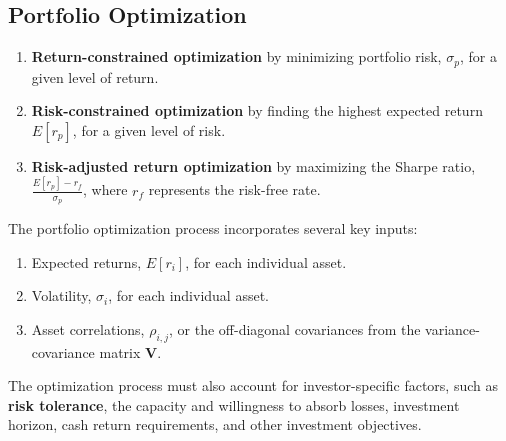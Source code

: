 \subsection{Portfolio Optimization}
\label{subsec:Portfolio Optimization}
\begin{enumerate}
	\item \textbf{Return-constrained optimization} by minimizing portfolio risk, $\sigma_p$, for a given level of return.
	\item \textbf{Risk-constrained optimization} by finding the highest expected return $E[r_p]$, for a given level of risk.
	\item \textbf{Risk-adjusted return optimization} by maximizing the Sharpe ratio,$\frac{E[r_p]-r_f}{\sigma_p}$, where $r_f$ represents the risk-free rate.
\end{enumerate}
The portfolio optimization process incorporates several key inputs:
\begin{enumerate}
	\item Expected returns, $E[r_i]$, for each individual asset.
	\item Volatility, $\sigma_i$, for each individual asset.
	\item Asset correlations, $\rho_{i,j}$, or the off-diagonal covariances from the variance-covariance matrix \textbf{V}.
\end{enumerate}
The optimization process must also account for investor-specific factors, such as \textbf{risk tolerance}, 
the capacity and willingness to absorb losses, investment horizon, 
cash return requirements, and other investment objectives. 

